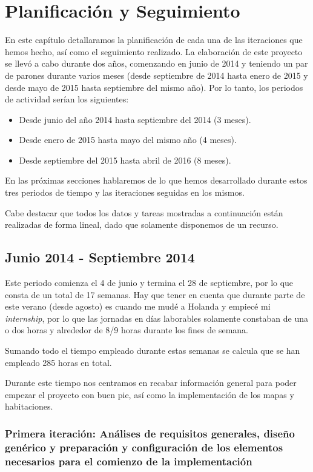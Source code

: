 \chapter{Planificación y Seguimiento}

En este capítulo detallaramos la planificación de cada una de las iteraciones que hemos hecho, así como el seguimiento realizado. La elaboración de este proyecto se llevó a cabo durante dos años, comenzando en junio de 2014 y teniendo un par de parones durante varios meses (desde septiembre de 2014 hasta enero de 2015 y desde mayo de 2015 hasta septiembre del mismo año). 
Por lo tanto, los periodos de actividad serían los siguientes:

\begin{itemize}
  \item Desde junio del año 2014 hasta septiembre del 2014 (3 meses).
  \item Desde enero de 2015 hasta mayo del mismo año (4 meses).
  \item Desde septiembre del 2015 hasta abril de 2016 (8 meses).
\end{itemize}

En las próximas secciones hablaremos de lo que hemos desarrollado durante estos tres periodos de tiempo y las iteraciones seguidas en los mismos.

Cabe destacar que todos los datos y tareas mostradas a continuación están realizadas de forma lineal, dado que solamente disponemos de un recurso.

\section{Junio 2014 - Septiembre 2014}

Este periodo comienza el 4 de junio y termina el 28 de septiembre, por lo que consta de un total de 17 semanas. Hay que tener en cuenta que durante parte de este verano (desde agosto) es cuando me mudé a Holanda y empiecé mi \textit{internship}, por lo que las jornadas en días laborables solamente constaban de una o dos horas y alrededor de 8/9 horas durante los fines de semana.

Sumando todo el tiempo empleado durante estas semanas se calcula que se han empleado 285 horas en total.

Durante este tiempo nos centramos en recabar información general para poder empezar el proyecto con buen pie, así como la implementación de los mapas y habitaciones.

\subsection{Primera iteración: Análises de requisitos generales, diseño genérico y preparación y configuración de los elementos necesarios para el comienzo de la implementación}

